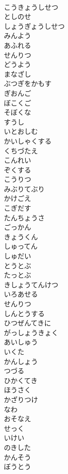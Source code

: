 \documentclass[8pt]{extreport}
\begin{document}
\begin{CJK}{UTF8}{min}
\\	こうきょうしせつ
\\	としのせ
\\	しょうぎょうしせつ
\\	みんよう
\\	あふれる
\\	せんりつ
\\	どうよう
\\	まなざし
\\	ぶつぎをかもす
\\	ぎおんご
\\	ぼこくご
\\	そぼくな
\\	すうし
\\	いとおしむ
\\	かいしゃくする
\\	くちづたえ
\\	こんれい
\\	ぞくする
\\	こうりつ
\\	みぶりてぶり
\\	かけごえ
\\	こぎだす
\\	たんちょうさ
\\	ごっかん
\\	きょうくん
\\	しゅってん
\\	しゅだい
\\	とうとぶ 
\\	たっとぶ
\\	きしょうてんけつ
\\	いろあせる
\\	せんりつ
\\	しんとうする
\\	ひつぜんてきに
\\	がっしょうきょく
\\	あいしゅう
\\	いくた
\\	かんしょう
\\	つづる
\\	ひかくてき
\\	ほうさく
\\	かざりつけ
\\	なわ
\\	おそなえ
\\	せっく
\\	いけい
\\	のきした
\\	かんそう
\\	ぼうとう

\end{CJK}
\end{document}
